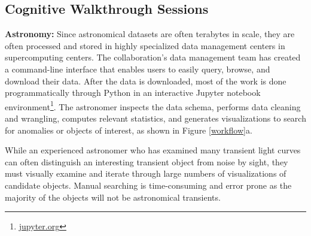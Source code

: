 \subsection{Cognitive Walkthrough Sessions}
\par \textbf{Astronomy:} Since astronomical datasets are often terabytes in scale, they are often processed and stored in highly specialized data management centers in supercomputing centers. The collaboration's data management team has created a command-line interface that enables users to easily query, browse, and download their data. 
After the data is downloaded, most of the work is done programmatically through Python in an interactive Jupyter notebook environment\footnote{\url{jupyter.org}}. The astronomer inspects the data schema, performs data cleaning and  wrangling, computes relevant statistics, and generates visualizations to search for anomalies or objects of interest, as shown in Figure \ref{workflow}a.
\par While an experienced astronomer who has examined many transient light curves can often distinguish an interesting transient object from noise by sight, they must visually examine and iterate through large numbers of visualizations of candidate objects. Manual searching is time-consuming and error prone as the majority of the objects will not be astronomical transients.
